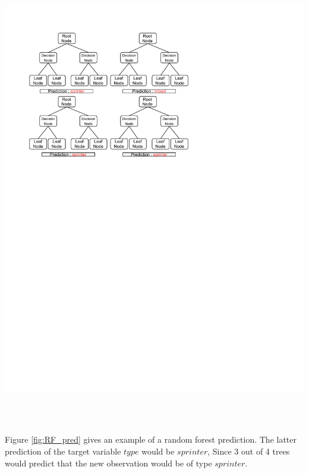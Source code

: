 \documentclass[12pt,a4paper]{article}
\let\origfigure\figure
\let\endorigfigure\endfigure
\renewenvironment{figure}[1][2] {
    \expandafter\origfigure\expandafter[H]
} {
    \endorigfigure
}
\begin{document}
\begin{figure}
\centering
\hspace{-3cm}\includegraphics[height = 20cm, width = 20 cm, trim=0in 6in 0in 0.5in,clip]{./includes/RF_pred.pdf}
    \caption{Diagram of a random forest prediction example. A new observation is shown to the model and each tree gives its prediction on the target variable, here $type$, of the Strava dataset. The figure is just for clarification of the concept and does not necessarily represent a possible outcome of a random forest model.  }
    \label{fig:RF_pred}
\end{figure}

Figure \ref{fig:RF_pred} gives an example of a random forest prediction. The latter prediction of the target variable \(type\) would be \(sprinter\), Since 3 out of 4 trees would predict that the new observation would be of type \(sprinter\).
\end{document}
